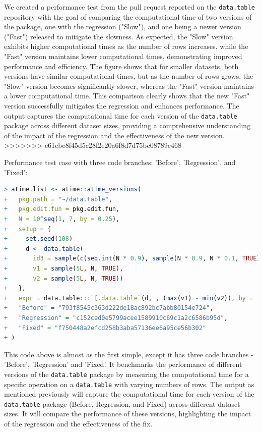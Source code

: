 \noindent \noindent We created a performance test from the pull request reported on the \texttt{data.table} repository with the goal of comparing the computational time of two versions of the package, one with the regression ("Slow"), and one being a newer version ("Fast") released to mitigate the slowness. As expected, the "Slow" version exhibits higher computational times as the number of rows increases, while the "Fast" version maintains lower computational times, demonstrating improved performance and efficiency. The figure shows that for smaller datasets, both versions have similar computational times, but as the number of rows grows, the "Slow" version becomes significantly slower, whereas the "Fast" version maintains a lower computational time. This comparison clearly shows that the new "Fast" version successfully mitigates the regression and enhances performance. The output captures the computational time for each version of the \texttt{data.table} package across different dataset sizes, providing a comprehensive understanding of the impact of the regression and the effectiveness of the new version.\\
>>>>>>> e61cbe8f45d5c28f2e20a6f8d7d75bc08789c468

\noindent Performance test case with three code branches: 'Before', 'Regression', and 'Fixed': \\

\begin{lstlisting}[language=R]
> atime.list <- atime::atime_versions(
+   pkg.path = "~/data.table",
+   pkg.edit.fun = pkg.edit.fun,
+   N = 10^seq(1, 7, by = 0.25),
+   setup = { 
+     set.seed(108)
+     d <- data.table(
+       id3 = sample(c(seq.int(N * 0.9), sample(N * 0.9, N * 0.1, TRUE))),
+       v1 = sample(5L, N, TRUE),
+       v2 = sample(5L, N, TRUE))
+   },
+   expr = data.table:::`[.data.table`(d, , (max(v1) - min(v2)), by = id3),
+   "Before" = "793f8545c363d222de18ac892bc7abb80154e724",
+   "Regression" = "c152ced0e5799acee1589910c69c1a2c6586b95d",
+   "Fixed" = "f750448a2efcd258b3aba57136ee6a95ce56b302"
+ )
\end{lstlisting}

\noindent This code above is almost as the first simple, except it has three code branches - 'Before', 'Regression' and 'Fixed'. It benchmarks the performance of different versions of the \texttt{data.table} package by measuring the computational time for a specific operation on a \texttt{data.table} with varying numbers of rows.
The output as mentioned previously will capture the computational time for each version of the \texttt{data.table} package (Before, Regression, and Fixed) across different dataset sizes. It will compare the performance of these versions, highlighting the impact of the regression and the effectiveness of the fix. \\


